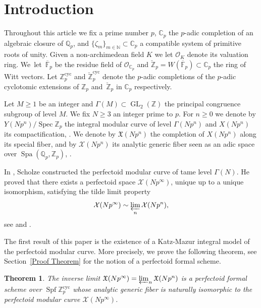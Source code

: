\documentclass[JEP,XML,SOM,Unicode,published]{cedram}
\newcommand{\cyc}{\mathrm{cyc}}
\numberwithin{equation}{section}
\newtheorem{theo}[prop]{Theorem}
\theoremstyle{definition}
\newcommand{\bb}[1]{\mathbb{#1}}
\newcommand{\n}[1]{\mathcal{#1}}
\newcommand{\f}[1]{\mathfrak{#1}}
\DeclareMathOperator{\GL}{GL}
\DeclareMathOperator{\Spf}{Spf}
\DeclareMathOperator{\Spec}{Spec}
\DeclareMathOperator{\Spa}{Spa}
\begin{document}
\section*{Introduction}
Throughout this article we fix a prime number $p$, $\bb{C}_p$ the $p$-adic completion of an algebraic closure of $\bb{Q}_p$, and $\{\zeta_{m}\}_{m\in \bb{N}}\subset \bb{C}_p$ a compatible system of primitive roots of unity. Given a non-archimedean field $K$ we let $\n{O}_K$ denote its valuation ring. We~let~$\overline{\bb{F}}_p$ be the residue field of $\n{O}_{\bb{C}_p}$ and $\breve{\bb{Z}}_p=W(\overline{\bb{F}}_p)\subset \bb{C}_p$ the ring of Witt vectors. Let $\bb{Z}_p^{\cyc}$ and $\breve{\bb{Z}}_p^{\cyc}$ denote the $p$-adic completions of the $p$-adic cyclotomic extensions of $\bb{Z}_p$ and~$\breve{\bb{Z}}_p$ in $\bb{C}_p$ respectively.

Let $M\geq 1$ be an integer and $\Gamma(M)\subset \GL_2(\bb{Z})$ the principal congruence subgroup of level $M$. We fix $N\geq 3$ an integer prime to $p$. For $n\geq 0$ we denote by $Y(Np^n)/ \Spec \bb{Z}_p$ the integral modular curve of level $\Gamma(Np^n)$ and $X(Np^n)$ its compactification, \cf \cite{katz1985arithmetic}. We denote by $\f{X}(Np^n)$ the completion of $X(Np^n)$ along its special fiber, and by $\n{X}(Np^n)$ its analytic generic fiber seen as an adic space over $\Spa(\bb{Q}_p, \bb{Z}_p)$, \cf \cite{MR1734903}.

In \cite{scholzeTorsCoho2015}, Scholze constructed the perfectoid modular curve of tame level $\Gamma(N)$. He proved that there exists a perfectoid space $\n{X}(Np^\infty)$, unique up to a unique isomorphism, satisfying the tilde limit property
\[
\n{X}(Np^\infty)\sim \varprojlim_n \n{X}(Np^n),
\]
see \cite[Def.\,2.4.1]{scholze2013moduli} and \cite[Def.\,2.4.2]{MR1734903}.

The first result of this paper is the existence of a Katz-Mazur integral model of the perfectoid modular curve. More precisely, we prove the following theorem, see Section~\ref{Proof Theorem} for the notion of a perfectoid formal scheme.

\begin{theo}
\label{Theo1Intro}
The inverse limit $\f{X}(Np^\infty)= \varprojlim_n \f{X}(Np^n)$ is a perfectoid formal scheme over $\Spf \bb{Z}_p^{\cyc}$ whose analytic generic fiber is naturally isomorphic to the perfectoid modular curve $\n{X}(Np^\infty)$.
\end{theo}
\end{document}
